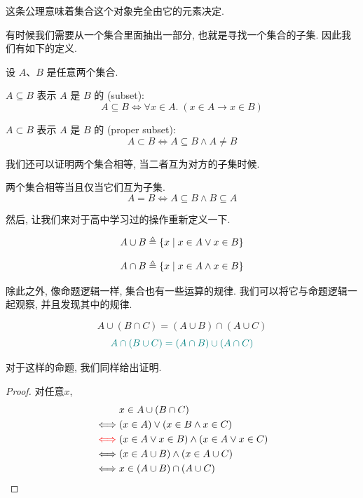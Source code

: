 这条公理意味着集合这个对象完全由它的元素决定. 

有时候我们需要从一个集合里面抽出一部分, 也就是寻找一个集合的子集. 因此我们有如下的定义. 

\begin{definition}[子集]
    设 $A$、$B$ 是任意两个集合. 

    $A \subseteq B$ 表示 $A$ 是 $B$ 的 (subset):
    \[
      A \subseteq B \iff \forall x \in A.\; (x \in A \to x \in B)
    \]

    $A \subset B$ 表示 $A$ 是 $B$ 的 (proper subset):
    \[
      A \subset B \iff A \subseteq B \land A \neq B
    \]
\end{definition}

我们还可以证明两个集合相等, 当二者互为对方的子集时候. 

\begin{theorem}
    两个集合相等当且仅当它们互为子集. 
    \[
      A = B \iff A \subseteq B \land B \subseteq A
    \]
\end{theorem}

然后, 让我们来对于高中学习过的操作重新定义一下. 

\begin{definition}
    \[
      A \cup B \triangleq \{ x \mid x \in A \lor x \in B\}
    \]
\end{definition}

\begin{definition}
    \[
      A \cap B \triangleq \{x \mid x \in A \land x \in B\}
    \]
\end{definition}

除此之外, 像命题逻辑一样, 集合也有一些运算的规律. 我们可以将它与命题逻辑一起观察, 并且发现其中的规律. 

\begin{theorem}
    \[
      A \cup (B \cap C) = (A \cup B) \cap (A \cup C)
    \]
    \[
      \textcolor{teal}{A \cap (B \cup C) = (A \cap B) \cup (A \cap C)}
    \]
\end{theorem}

对于这样的命题, 我们同样给出证明. 

\begin{proof}
    对任意$x$,
    \begin{align*}
        &x \in A \cup (B \cap C) \\
        \iff & (x \in A) \lor (x \in B \land x \in C) \\
        \textcolor{red}{\iff} & (x \in A \lor x \in B) \land (x \in A \lor x \in C) \\
        \iff & (x \in A \cup B) \land (x \in A \cup C) \\
        \iff & x \in (A \cup B) \cap (A \cup C)
      \end{align*}
\end{proof}

